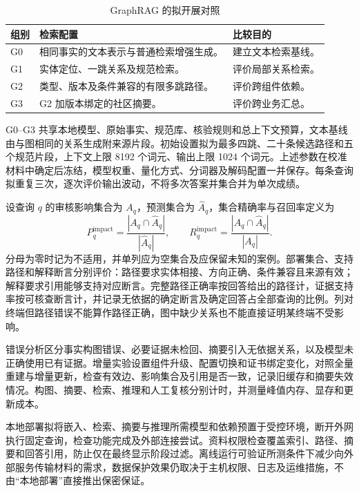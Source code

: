 \begin{table}[htbp]\centering\small
  \caption{GraphRAG 的拟开展对照}
  \label{tab:graphrag-ablation-design}
  \begin{tabularx}{\linewidth}{@{}p{0.8cm}>{\raggedright\arraybackslash}X>{\raggedright\arraybackslash}p{3.0cm}@{}}\toprule
  组别 & 检索配置 & 比较目的\\\midrule
  G0 & 相同事实的文本表示与普通检索增强生成。 & 建立文本检索基线。\\
  G1 & 实体定位、一跳关系及规范检索。 & 评价局部关系检索。\\
  G2 & 类型、版本及条件兼容的有限多跳路径。 & 评价跨组件依赖。\\
  G3 & G2 加版本绑定的社区摘要。 & 评价跨业务汇总。\\\bottomrule
  \end{tabularx}
\end{table}

G0--G3 共享本地模型、原始事实、规范库、核验规则和总上下文预算，文本基线由与图相同的关系生成附来源片段。初始设置拟为最多四跳、二十条候选路径和五个规范片段，上下文上限 8192 个词元、输出上限 1024 个词元。上述参数在校准材料中确定后冻结，模型权重、量化方式、分词器及解码配置一并保存。每条查询拟重复三次，逐次评价输出波动，不将多次答案并集合并为单次成绩。

设查询 $q$ 的审核影响集合为 $A_q$，预测集合为 $\widehat A_q$，集合精确率与召回率定义为
\begin{equation}
  P_q^{\mathrm{impact}}=\frac{|A_q\cap\widehat A_q|}{|\widehat A_q|},\qquad
  R_q^{\mathrm{impact}}=\frac{|A_q\cap\widehat A_q|}{|A_q|}.
  \label{eq:graphrag-impact-metrics}
\end{equation}
分母为零时记为不适用，并单列应为空集合及应保留未知的案例。部署集合、支持路径和解释断言分别评价：路径要求实体相接、方向正确、条件兼容且来源有效；解释要求引用能够支持对应断言。完整路径正确率按回答给出的路径计，证据支持率按可核查断言计，并记录无依据的确定断言及确定回答占全部查询的比例。列对终端但路径错误不能算作路径正确，图中缺少关系也不能直接证明某终端不受影响。

错误分析区分事实构图错误、必要证据未检回、摘要引入无依据关系，以及模型未正确使用已有证据。增量实验设置组件升级、配置切换和证书绑定变化，对照全量重建与增量更新，检查有效边、影响集合及引用是否一致，记录旧缓存和摘要失效情况。构图、摘要、检索、推理和人工复核分别计时，并测量峰值内存、显存和更新成本。

本地部署拟将嵌入、检索、摘要与推理所需模型和依赖预置于受控环境，断开外网执行固定查询，检查功能完成及外部连接尝试。资料权限检查覆盖索引、路径、摘要和回答引用，防止仅在最终显示阶段过滤。离线运行可验证所测条件下减少向外部服务传输材料的需求，数据保护效果仍取决于主机权限、日志及运维措施，不由“本地部署”直接推出保密保证。

